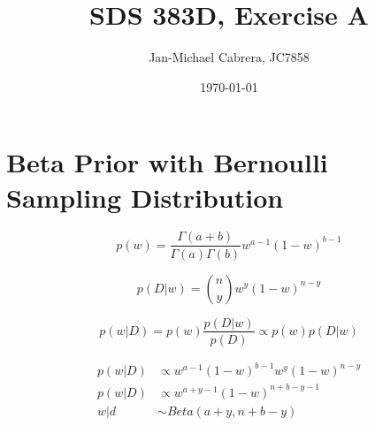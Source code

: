 \documentclass[12pt]{article}%
\begin{document}
      \title{SDS 383D, Exercise A}
      \author{Jan-Michael Cabrera, JC7858}
      \date{\today}
      \maketitle


      \section*{Beta Prior with Bernoulli Sampling Distribution}

            \begin{equation}\label{eq:prior}
                  p(w) = \frac{\Gamma(a+b)}{\Gamma(a)\Gamma(b)}w^{a-1}(1-w)^{b-1}
            \end{equation}

            \begin{equation}\label{eq:likelihood}
                  p(D|w) = \binom{n}{y} w^y (1 - w)^{n-y}
            \end{equation}

            \begin{equation}\label{eq:posterior_1}
                  p(w|D) = p(w) \frac{p(D|w)}{p(D)} \propto p(w) p(D|w)
            \end{equation}

            \begin{align}
                  p(w|D) &\propto w^{a-1}(1-w)^{b-1}w^y(1-w)^{n-y} \\
                  p(w|D) &\propto w^{a+y-1}(1-w)^{n+b-y-1} \\
                  w|d &\sim Beta(a+y, n+b-y)
            \end{align}
\end{document}
